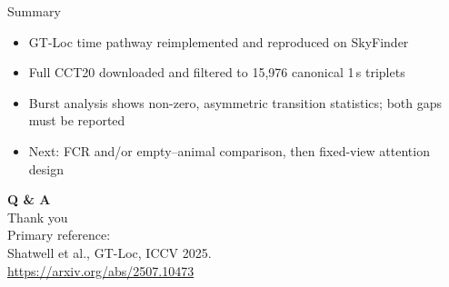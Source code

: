 \documentclass[aspectratio=169,11pt]{beamer}
\begin{document}
\begin{frame}{Summary}
\begin{itemize}
  \item GT-Loc time pathway reimplemented and reproduced on SkyFinder
  \item Full CCT20 downloaded and filtered to 15{,}976 canonical 1\,s triplets
  \item Burst analysis shows non-zero, asymmetric transition statistics; both gaps must be reported
  \item Next: FCR and/or empty--animal comparison, then fixed-view attention design
\end{itemize}
\end{frame}

\begin{frame}[plain]
\begin{center}
\vspace{2.2cm}
{\color{aiia}\Huge\bfseries Q \& A}\\[1.0em]
{\large Thank you}\\[1.4em]
{\footnotesize\color{muted}
Primary reference:\\
Shatwell et al., GT-Loc, ICCV 2025.\\
\url{https://arxiv.org/abs/2507.10473}}
\end{center}
\end{frame}
\end{document}
